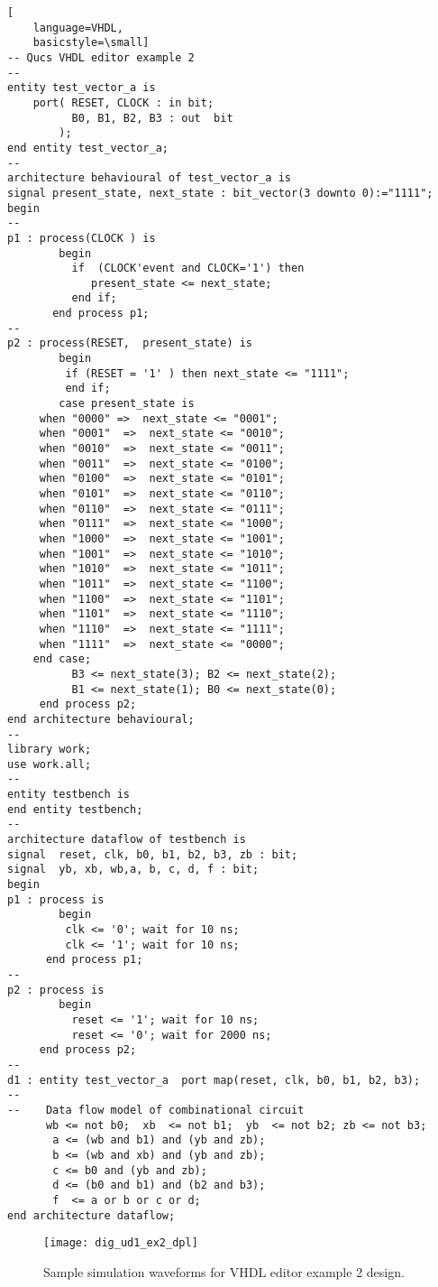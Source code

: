 \begin{itemize}
\begin{lstlisting}[
    language=VHDL,
    basicstyle=\small]
-- Qucs VHDL editor example 2
--
entity test_vector_a is
	port( RESET, CLOCK : in bit;
	      B0, B1, B2, B3 : out  bit
	    );
end entity test_vector_a;
--
architecture behavioural of test_vector_a is
signal present_state, next_state : bit_vector(3 downto 0):="1111";
begin
--
p1 : process(CLOCK ) is
        begin
          if  (CLOCK'event and CLOCK='1') then
             present_state <= next_state;
          end if;
       end process p1;
--      
p2 : process(RESET,  present_state) is
        begin	
         if (RESET = '1' ) then next_state <= "1111"; 
         end if;
        case present_state is
	 when "0000" =>  next_state <= "0001";   
	 when "0001"  =>  next_state <= "0010"; 
	 when "0010"  =>  next_state <= "0011";  
	 when "0011"  =>  next_state <= "0100";   
	 when "0100"  =>  next_state <= "0101";   
	 when "0101"  =>  next_state <= "0110";   
	 when "0110"  =>  next_state <= "0111";   
	 when "0111"  =>  next_state <= "1000";   
	 when "1000"  =>  next_state <= "1001";   
	 when "1001"  =>  next_state <= "1010"; 
	 when "1010"  =>  next_state <= "1011"; 
	 when "1011"  =>  next_state <= "1100"; 
	 when "1100"  =>  next_state <= "1101"; 
	 when "1101"  =>  next_state <= "1110"; 
	 when "1110"  =>  next_state <= "1111"; 
	 when "1111"  =>  next_state <= "0000";
	end case;
          B3 <= next_state(3); B2 <= next_state(2); 
          B1 <= next_state(1); B0 <= next_state(0);
     end process p2;
end architecture behavioural;
--
library work;
use work.all;
--
entity testbench is
end entity testbench;
--
architecture dataflow of testbench is 
signal  reset, clk, b0, b1, b2, b3, zb : bit;
signal  yb, xb, wb,a, b, c, d, f : bit;
begin
p1 : process is
        begin
         clk <= '0'; wait for 10 ns;
         clk <= '1'; wait for 10 ns;
      end process p1;
--
p2 : process is
        begin
          reset <= '1'; wait for 10 ns;
          reset <= '0'; wait for 2000 ns;
     end process p2;	
--
d1 : entity test_vector_a  port map(reset, clk, b0, b1, b2, b3);
--
--    Data flow model of combinational circuit
      wb <= not b0;  xb  <= not b1;  yb  <= not b2; zb <= not b3; 
       a <= (wb and b1) and (yb and zb);
       b <= (wb and xb) and (yb and zb);
       c <= b0 and (yb and zb);
       d <= (b0 and b1) and (b2 and b3);
       f  <= a or b or c or d;
end architecture dataflow;
\end{lstlisting}

 \begin{figure}[ht]
  \centering
  \texttt{[image: dig\_ud1\_ex2\_dpl]}
  \caption{Sample simulation waveforms for VHDL editor example 2 design.}
  \label{fig:dig_ud1_ex2_dpl}
\end{figure} 


\end{itemize}
